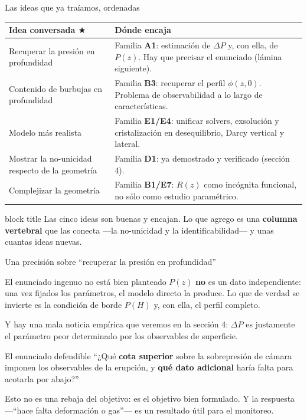 \documentclass[aspectratio=169,10pt,t]{beamer}
\newcommand{\ideageo}{\textcolor{magma}{$\bigstar$}}
\newcommand{\mensaje}[1]{%
  \vfill
  \begin{beamercolorbox}[wd=\linewidth,sep=0.4em,rounded=true]{block title}
  \footnotesize #1
  \end{beamercolorbox}}
\begin{document}
\begin{frame}{Las ideas que ya traíamos, ordenadas}
\small
\begin{tabular}{@{}p{}p{}@{}}
\toprule
\textbf{Idea conversada} \ideageo & \textbf{Dónde encaja} \\
\midrule
Recuperar la presión en profundidad &
Familia \textbf{A1}: estimación de $\Delta P$ y, con ella, de $P(z)$.
\alert{Hay que precisar el enunciado} (lámina siguiente). \\[0.4em]
Contenido de burbujas en profundidad &
Familia \textbf{B3}: recuperar el perfil $\phi(z,0)$. Problema de
observabilidad a lo largo de características. \\[0.4em]
Modelo más realista &
Familia \textbf{E1/E4}: unificar solvers, exsolución y cristalización en
desequilibrio, Darcy vertical y lateral. \\[0.4em]
Mostrar la no-unicidad respecto de la geometría &
Familia \textbf{D1}: \alert{ya demostrado y verificado} (sección 4). \\[0.4em]
Complejizar la geometría &
Familia \textbf{B1/E7}: $R(z)$ como \alert{incógnita funcional}, no sólo como
estudio paramétrico. \\
\bottomrule
\end{tabular}

\mensaje{Las cinco ideas son buenas y encajan. Lo que agrego es una
\textbf{columna vertebral} que las conecta —la no-unicidad y la
identificabilidad— y unas cuantas ideas nuevas.}
\end{frame}

\begin{frame}{Una precisión sobre ``recuperar la presión en profundidad''}
\begin{alertblock}{El enunciado ingenuo no está bien planteado}
$P(z)$ \textbf{no} es un dato independiente: una vez fijados los parámetros, el
modelo directo la produce. Lo que de verdad se invierte es la
\alert{condición de borde} $P(H)$ y, con ella, el perfil completo.
\end{alertblock}
\medskip
Y hay una mala noticia empírica que veremos en la sección 4: $\Delta P$ es
justamente el parámetro \alert{peor determinado} por los observables de
superficie.
\medskip
\begin{exampleblock}{El enunciado defendible}
``¿Qué \textbf{cota superior} sobre la sobrepresión de cámara imponen los
observables de la erupción, y \textbf{qué dato adicional} haría falta para
acotarla por abajo?''
\end{exampleblock}
\medskip
Esto no es una rebaja del objetivo: es el objetivo bien formulado. Y la
respuesta —``hace falta deformación o gas''— es un resultado útil para el
monitoreo.
\end{frame}
\end{document}
